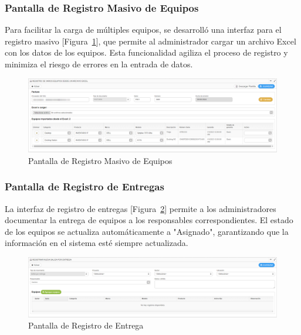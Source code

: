 \documentclass[stu, 12pt, letterpaper, donotrepeattitle, floatsintext, natbib]{apa7}
\begin{document}
\subsubsection{Pantalla de Registro Masivo de Equipos}
Para facilitar la carga de m\'ultiples equipos, se desarroll\'o una interfaz para el registro masivo [Figura~\ref{equipoMasivo}], que permite al administrador cargar un archivo Excel con los datos de los equipos. Esta funcionalidad agiliza el proceso de registro y minimiza el riesgo de errores en la entrada de datos.
\begin{figure}[H]
    \centering
    \caption{Pantalla de Registro Masivo de Equipos}\label{equipoMasivo}
    \includegraphics[width=16.5cm]{./images/equipoMasivo.png}
\end{figure}
\subsubsection{Pantalla de Registro de Entregas}
La interfaz de registro de entregas [Figura~\ref{entrega}] permite a los administradores documentar la entrega de equipos a los responsables correspondientes. El estado de los equipos se actualiza autom\'aticamente a "Asignado", garantizando que la informaci\'on en el sistema est\'e siempre actualizada.
\begin{figure}[H]
    \centering
    \caption{Pantalla de Registro de Entrega}\label{entrega}
    \includegraphics[width=16.5cm]{./images/entregaEquipo.png}
\end{figure}
\end{document}
